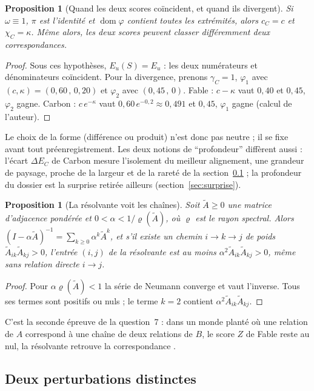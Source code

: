 \documentclass[11pt,a4paper]{article}
\theoremstyle{definition}
\theoremstyle{plain}
\newtheorem{proposition}[definition]{Proposition}
\newcommand{\dom}{\operatorname{dom}}
\newcommand{\vg}{\,{,}\,}
\begin{document}
\begin{proposition}[Quand les deux scores coïncident, et quand ils divergent]
\label{prop:fablecarbon}
Si $\omega\equiv1$, $\pi$ est l'identité et $\dom\varphi$ contient toutes les extrémités, alors
$c_C=c$ et $\chi_C=\kappa$. Même alors, les deux scores peuvent classer différemment deux
correspondances.
\end{proposition}
\begin{proof}
Sous ces hypothèses, $E_u(S)=E_u$ : les deux numérateurs et dénominateurs coïncident. Pour la
divergence, prenons $\gamma_C=1$, $\varphi_1$ avec $(c,\kappa)=(0{,}60\vg0{,}20)$ et $\varphi_2$
avec $(0{,}45\vg0)$. Fable : $c-\kappa$ vaut $0{,}40$ et $0{,}45$, $\varphi_2$ gagne. Carbon :
$c\,e^{-\kappa}$ vaut $0{,}60\,e^{-0{,}2}\approx0{,}491$ et $0{,}45$, $\varphi_1$ gagne (calcul
de l'auteur).
\end{proof}
Le choix de la forme (différence ou produit) n'est donc pas neutre ; il se fixe avant tout
préenregistrement. Les deux notions de \enquote{profondeur} diffèrent aussi : l'écart $\Delta E_C$
de Carbon mesure l'isolement du meilleur alignement, une grandeur de paysage, proche de la
largeur et de la rareté de la section~\ref{sec:perturbations} ; la profondeur du dossier est la
surprise retirée ailleurs (section~\ref{sec:surprise}).

\begin{proposition}[La résolvante voit les chaînes]
\label{prop:resolvante}
Soit $\tilde A\ge0$ une matrice d'adjacence pondérée et $0<\alpha<1/\varrho(\tilde A)$, où
$\varrho$ est le rayon spectral. Alors $(I-\alpha\tilde A)^{-1}=\sum_{k\ge0}\alpha^k\tilde A^k$, et
s'il existe un chemin $i\to k\to j$ de poids $\tilde A_{ik}\tilde A_{kj}>0$, l'entrée $(i,j)$ de la
résolvante est au moins $\alpha^2\tilde A_{ik}\tilde A_{kj}>0$, même sans relation directe $i\to j$.
\end{proposition}
\begin{proof}
Pour $\alpha\varrho(\tilde A)<1$ la série de Neumann converge et vaut l'inverse. Tous ses termes sont
positifs ou nuls ; le terme $k=2$ contient $\alpha^2\tilde A_{ik}\tilde A_{kj}$.
\end{proof}
C'est la seconde épreuve de la question~7 : dans un monde planté où une relation de $A$ correspond
à une chaîne de deux relations de $B$, le score $Z$ de Fable reste au nul, la résolvante retrouve
la correspondance \cite[section~4]{q7}.

\subsection{Deux perturbations distinctes}
\label{sec:perturbations}
\end{document}
